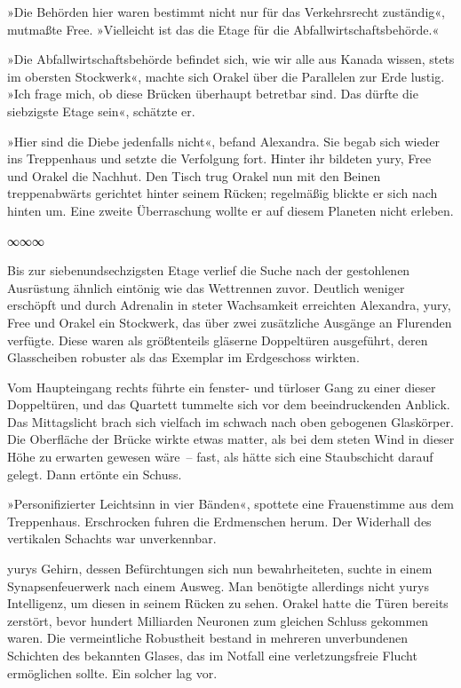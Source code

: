 »Die Behörden hier waren bestimmt nicht nur für das Verkehrsrecht zuständig«, mutmaßte Free. »Vielleicht ist das die Etage für die Abfallwirtschaftsbehörde.«

»Die Abfallwirtschaftsbehörde befindet sich, wie wir alle aus Kanada wissen, stets im obersten Stockwerk«, machte sich Orakel über die Parallelen zur Erde lustig. »Ich frage mich, ob diese Brücken überhaupt betretbar sind. Das dürfte die siebzigste Etage sein«, schätzte er.

»Hier sind die Diebe jedenfalls nicht«, befand Alexandra. Sie begab sich wieder ins Treppenhaus und setzte die Verfolgung fort. Hinter ihr bildeten yury, Free und Orakel die Nachhut. Den Tisch trug Orakel nun mit den Beinen treppenabwärts gerichtet hinter seinem Rücken; regelmäßig blickte er sich nach hinten um. Eine zweite Überraschung wollte er auf diesem Planeten nicht erleben.

\begin{center}
∞∞∞
\end{center}

Bis zur siebenundsechzigsten Etage verlief die Suche nach der gestohlenen Ausrüstung ähnlich eintönig wie das Wettrennen zuvor. Deutlich weniger erschöpft und durch Adrenalin in steter Wachsamkeit erreichten Alexandra, yury, Free und Orakel ein Stockwerk, das über zwei zusätzliche Ausgänge an Flurenden verfügte. Diese waren als größtenteils gläserne Doppeltüren ausgeführt, deren Glasscheiben robuster als das Exemplar im Erdgeschoss wirkten.

Vom Haupteingang rechts führte ein fenster- und türloser Gang zu einer dieser Doppeltüren, und das Quartett tummelte sich vor dem beeindruckenden Anblick. Das Mittagslicht brach sich vielfach im schwach nach oben gebogenen Glaskörper. Die Oberfläche der Brücke wirkte etwas matter, als bei dem steten Wind in dieser Höhe zu erwarten gewesen wäre~– fast, als hätte sich eine Staubschicht darauf gelegt. Dann ertönte ein Schuss.

»Personifizierter Leichtsinn in vier Bänden«, spottete eine Frauenstimme aus dem Treppenhaus. Erschrocken fuhren die Erdmenschen herum. Der Widerhall des vertikalen Schachts war unverkennbar.

yurys Gehirn, dessen Befürchtungen sich nun bewahrheiteten, suchte in einem Synapsenfeuerwerk nach einem Ausweg. Man benötigte allerdings nicht yurys Intelligenz, um diesen in seinem Rücken zu sehen. Orakel hatte die Türen bereits zerstört, bevor hundert Milliarden Neuronen zum gleichen Schluss gekommen waren. Die vermeintliche Robustheit bestand in mehreren unverbundenen Schichten des bekannten Glases, das im Notfall eine verletzungsfreie Flucht ermöglichen sollte. Ein solcher lag vor.

